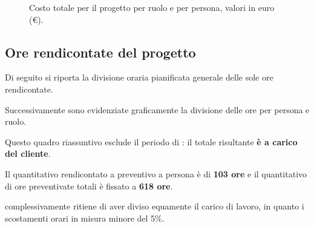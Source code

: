 \begin{figure}[H]
\label{tab:cgen1}

  \caption{Costo totale per il progetto \proj{} per ruolo e per persona, valori in euro (\euro).}
\end{figure}


\pagebreak[4]



\subsection{Ore rendicontate del progetto} 
\label{sec:orerend}
Di seguito si riporta la divisione oraria pianificata generale delle sole ore rendicontate.

Successivamente sono evidenziate graficamente la divisione delle ore per persona e ruolo.

Questo quadro riassuntivo esclude il periodo di {\AR}: il totale risultante \textbf{è a carico del cliente}.

Il quantitativo rendicontato a preventivo a persona è di \textbf{103 ore} e il quantitativo di ore preventivate totali è fissato a \textbf{618 ore}.

{\hx} complessivamente ritiene di aver diviso equamente il carico di lavoro, in quanto i scostamenti orari in misura minore del 5\%.


